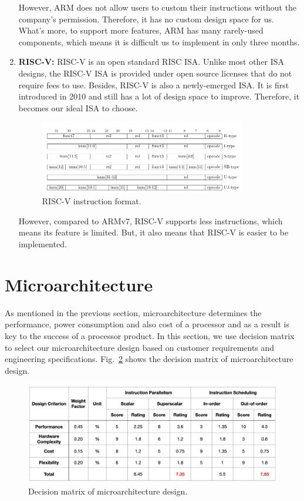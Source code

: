 \begin{enumerate}
However, ARM does not allow users to custom their instructions without the company's permission. Therefore, it has no custom design space for us. What's more, to support more features, ARM has many rarely-used components, which means it is difficult us to implement in only three months.

\item \textbf{RISC-V:} RISC-V is an open standard RISC ISA. Unlike most other ISA designs, the RISC-V ISA is provided under open source licenses that do not require fees to use. Besides, RISC-V is also a newly-emerged ISA. It is first introduced in 2010 and still has a lot of design space to improve. Therefore, it becomes our ideal ISA to choose.

\begin{figure}[!htp]
    \centering
    \includegraphics[width=0.85\textwidth]{figure/riscv-isa.png}
    \caption{RISC-V instruction format\cite{RISC-V_unprivileged_ISA}.}
    \label{fig:RISCV_inst}
\end{figure}

However, compared to ARMv7, RISC-V supports less instructions, which means its feature is limited. But, it also means that RISC-V is easier to be implemented.

\end{enumerate}

\section{Microarchitecture} %
As mentioned in the previous section, microarchitecture determines the performance, power consumption and also cost of a processor and as a result is key to the success of a processor product. In this section, we use decision matrix to select our microarchitecture design based on customer requirements and engineering specifications. Fig.~\ref{fig:dm-uarch} shows the decision matrix of microarchitecture design.

\begin{figure}[!htp]
    \centering
    \includegraphics[width=\textwidth]{figure/dm-uarch.png}
    \caption{Decision matrix of microarchitecture design.}
    \label{fig:dm-uarch}
\end{figure}


